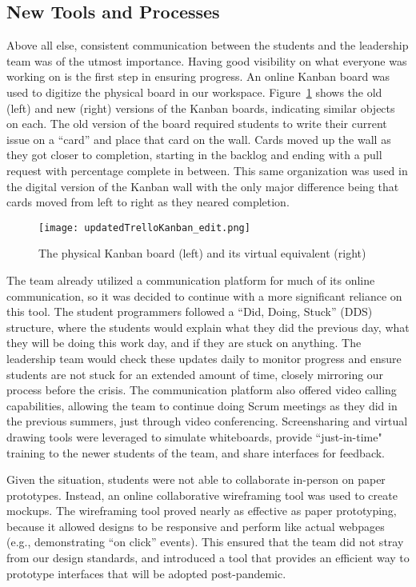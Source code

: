 \subsection{New Tools and Processes}
Above all else, consistent communication between the students and the leadership team was of the utmost importance. Having good visibility on what everyone was working on is the first step in ensuring progress. An online Kanban board was used to digitize the physical board in our workspace. Figure~\ref{fig:digitalkanban} shows the old (left) and new (right) versions of the Kanban boards, indicating similar objects on each. The old version of the board required students to write their current issue on a ``card'' and place that card on the wall. Cards moved up the wall as they got closer to completion, starting in the backlog and ending with a pull request with percentage complete in between. This same organization was used in the digital version of the Kanban wall with the only major difference being that cards moved from left to right as they neared completion.

\begin{figure}[h]
 \centering
 \texttt{[image: updatedTrelloKanban\_edit.png]}
 \caption{The physical Kanban board (left) and its virtual equivalent (right)}
 \label{fig:digitalkanban}
\end{figure}

The team already utilized a communication platform for much of its online communication, so it was decided to continue with a more significant reliance on this tool. The student programmers followed a ``Did, Doing, Stuck'' (DDS) structure, where the students would explain what they did the previous day, what they will be doing this work day, and if they are stuck on anything. The leadership team would check these updates daily to monitor progress and ensure students are not stuck for an extended amount of time, closely mirroring our process before the crisis. The communication platform also offered video calling capabilities, allowing the team to continue doing Scrum meetings as they did in the previous summers, just through video conferencing. Screensharing and virtual drawing tools were leveraged to simulate whiteboards,  provide “just-in-time" training to the newer students of the team, and share interfaces for feedback.

Given the situation, students were not able to collaborate in-person on paper prototypes. Instead, an online collaborative wireframing tool was used to create mockups. The wireframing tool proved nearly as effective as paper prototyping, because it allowed designs to be responsive and perform like actual webpages (e.g., demonstrating ``on click'' events). This ensured that the team did not stray from our design standards, and introduced a tool that provides an efficient way to prototype interfaces that will be adopted post-pandemic.

